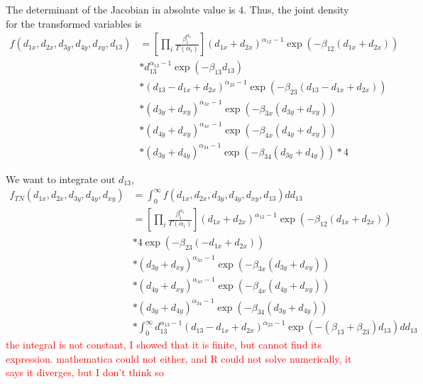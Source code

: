 \documentclass[12pt,letterpaper]{article}
\newcommand{\falta}[1]{\textcolor{red}{#1}}
\begin{document}
\begin{enumerate}
  The determinant of the Jacobian in absolute value is $4$. Thus, the
  joint density for the transformed variables is
  \begin{align*}
    f(d_{1x},d_{2x},d_{3y},d_{4y},d_{xy},d_{13}) &=
    \left[ \prod_i \frac{\beta_i^{\alpha_i}}{\Gamma(\alpha_i)} \right] (d_{1x}+d_{2x})^{\alpha_{12}-1}
    \exp{(-\beta_{12}(d_{1x}+d_{2x}))} \\
    &* d_{13}^{\alpha_{13}-1}\exp{(-\beta_{13}d_{13})} \\
    &* (d_{13}-d_{1x}+d_{2x})^{\alpha_{23}-1}\exp{(-\beta_{23}(d_{13}-d_{1x}+d_{2x}))}\\
    &* (d_{3y}+d_{xy})^{\alpha_{3x}-1}\exp{(-\beta_{3x}(d_{3y}+d_{xy}))} \\
    &*(d_{4y}+d_{xy})^{\alpha_{4x}-1}\exp{(-\beta_{4x}(d_{4y}+d_{xy}))} \\
    &* (d_{3y}+d_{4y})^{\alpha_{34}-1}\exp{(-\beta_{34}(d_{3y}+d_{4y}))} *4
  \end{align*}

  We want to integrate out $d_{13}$,
  \begin{align*}
    f_{TN}(d_{1x},d_{2x},d_{3y},d_{4y},d_{xy}) &= \int_0^\infty
    f(d_{1x},d_{2x},d_{3y},d_{4y},d_{xy},d_{13}) d d_{13} \\
    &=\left[ \prod_i \frac{\beta_i^{\alpha_i}}{\Gamma(\alpha_i)} \right] (d_{1x}+d_{2x})^{\alpha_{12}-1}
    \exp{(-\beta_{12}(d_{1x}+d_{2x}))} \\
    &* 4\exp{(-\beta_{23}(-d_{1x}+d_{2x}))}\\
    &* (d_{3y}+d_{xy})^{\alpha_{3x}-1}\exp{(-\beta_{3x}(d_{3y}+d_{xy}))} \\
    &*(d_{4y}+d_{xy})^{\alpha_{4x}-1}\exp{(-\beta_{4x}(d_{4y}+d_{xy}))} \\
    &*(d_{3y}+d_{4y})^{\alpha_{34}-1}\exp{(-\beta_{34}(d_{3y}+d_{4y}))} \\
    &* \int_0^\infty
    d_{13}^{\alpha_{13}-1}(d_{13}-d_{1x}+d_{2x})^{\alpha_{23}-1}\exp{(-(\beta_{13}+\beta_{23})d_{13})}
    d d_{13}
  \end{align*}
\falta{the integral is not constant, I showed that it is finite, but
  cannot find its expression. mathematica could not either, and R
  could not solve numerically, it says it diverges, but I don't think so}

\end{enumerate}
\end{document}
